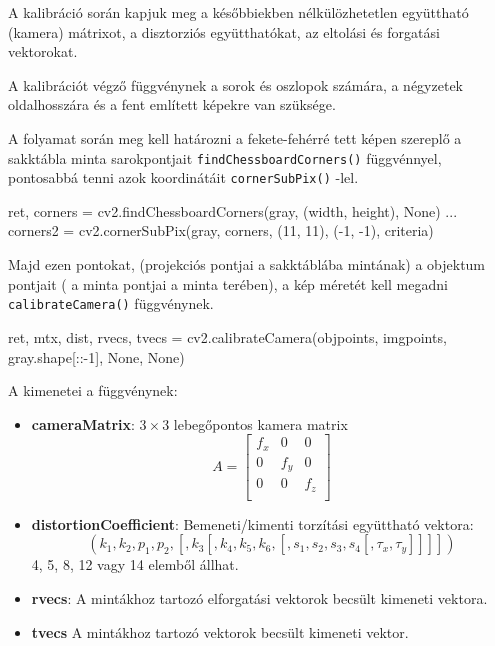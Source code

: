 A kalibráció során kapjuk meg a későbbiekben nélkülözhetetlen együttható (kamera) mátrixot, a disztorziós együtthatókat, az eltolási és forgatási vektorokat.

A kalibrációt végző függvénynek a sorok és oszlopok számára, a négyzetek oldalhosszára és a fent említett képekre van szüksége.

A folyamat során meg kell határozni a fekete-fehérré tett képen szereplő a sakktábla minta sarokpontjait 
\texttt{findChessboardCorners()} függvénnyel, pontosabbá tenni azok koordinátáit 
\texttt{cornerSubPix()} -lel. 
\begin{python}
ret, corners = cv2.findChessboardCorners(gray, (width, height), None)
...
corners2 = cv2.cornerSubPix(gray, corners, (11, 11), (-1, -1), criteria)
\end{python} 

Majd ezen pontokat, (projekciós pontjai a sakktáblába mintának) a objektum pontjait ( a minta pontjai a minta terében), a kép méretét kell megadni \texttt{calibrateCamera()} függvénynek. \\

\begin{python}
  ret, mtx, dist, rvecs, tvecs = cv2.calibrateCamera(objpoints,
   imgpoints, gray.shape[::-1], None, None)
\end{python}  
\cite{camera_calibration}

A kimenetei a függvénynek:
\begin{itemize}
\item {\bf cameraMatrix}: $3 \times 3$ lebegőpontos kamera matrix
\[
A = 
\begin{bmatrix}
	f_x & 0 & 0 \\
	0 & f_y & 0 \\
	0 & 0 & f_z \\
\end{bmatrix}
\]

\item {\bf distortionCoefficient}: Bemeneti/kimenti torzítási együttható vektora:
\[
(k_1, k_2, p_1, p_2, [, k_3 [, k_4, k_5, k_6, [, s_1, s_2, s_3, s_4 [, \tau_x, \tau_y]]]])
\]
4, 5, 8, 12 vagy 14 elemből állhat.


\item {\bf rvecs}: A mintákhoz tartozó elforgatási vektorok becsült kimeneti vektora.

\item {\bf tvecs}  A mintákhoz tartozó vektorok becsült kimeneti vektor. \cite{camera_calib_opencv}
\end{itemize}



